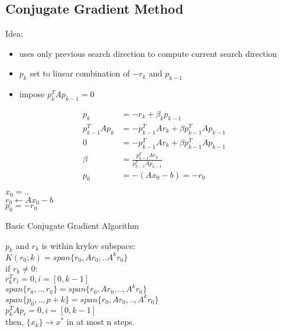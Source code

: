 \documentclass[8pt,letter]{article}
\begin{document}
\begin{multicols*}{2}
  \vfill\null
  \columnbreak
  
  \subsection{Conjugate Gradient Method}
  Idea:
  \begin{itemize}
  \item uses only previous search direction to compute current search direction
  \item $p_k$ set to linear combination of $-r_k$ and $p_{k-1}$
  \item impose $p_k^T A p_{k-1}=0$
  \end{itemize}
  \begin{align*}
    p_k &= -r_k + \beta_k p_{k-1}\\
    p_{k-1}^T A p_k &= -p_{k-1}^T A r_k + \beta p_{k-1}^T A p_{k-1}\\
    0 &= -p_{k-1}^T A r_k + \beta p_{k-1}^T A p_{k-1}\\
    \beta &= \frac{p_{k-1}^T A r_k}{p_{k-1}^T A p_{k-1}}\\
    p_0& = -(Ax_0-b)=-r_0
  \end{align*}
  \begin{algorithm}[H]
    $x_0 = ..$\\
    $r_0 \leftarrow Ax_0-b$\\
    $p_0 = -r_0$\\
    \caption{Basic Conjugate Gradient Algorithm\label{Algo_CGBasic}}
  \end{algorithm}
  $p_k$ and $r_k$ is within krylov subspace:\\
  $K(r_0;k) =span\{r_0, Ar_0, ..A^k r_0\}$\\
  if $r_k \not= 0$:\\
  $r_k^T r_i = 0, i=[0,k-1]$\\
  $span\{r_0,..,r_k\} = span\{r_0,Ar_0,..,A^k r_0\}$\\
  $span\{p_0,..,p+k\}=span\{r_0,Ar_0,..,A^k r_0\}$\\
  $p_k^T A p_i=0, i=[0,k-1]$\\
  then, $\{x_k\} \rightarrow x^*$ in at most n steps.\\


\end{multicols*}
\end{document}
